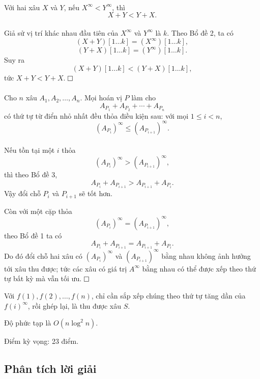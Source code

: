 \documentclass[11pt]{article}
\newcommand{\proofbox}{\ensuremath{\vcenter{\hrule height 0.45pt
  \hbox{\vrule width 0.45pt height 6pt\kern 6pt\vrule width 0.45pt}
  \hrule height 0.45pt}}}
\begin{document}
\paragraph{}
Với hai xâu \(X\) và \(Y\), nếu \(X^\infty<Y^\infty\), thì
\[
X+Y<Y+X.
\]

\paragraph{}
Giả sử vị trí khác nhau đầu tiên của \(X^\infty\) và \(Y^\infty\) là \(k\).
Theo Bổ đề 2, ta có
\[
(X+Y)[1\ldots k]=(X^\infty)[1\ldots k],
\]
\[
(Y+X)[1\ldots k]=(Y^\infty)[1\ldots k].
\]
Suy ra
\[
(X+Y)[1\ldots k]<(Y+X)[1\ldots k],
\]
tức \(X+Y<Y+X\). \proofbox

\paragraph{}
Cho \(n\) xâu \(A_1,A_2,\ldots,A_n\). Mọi hoán vị \(P\) làm cho
\[
A_{P_1}+A_{P_2}+\cdots+A_{P_n}
\]
có thứ tự từ điển nhỏ nhất đều thỏa điều kiện sau: với mọi \(1\le i<n\),
\[
(A_{P_i})^\infty\le (A_{P_{i+1}})^\infty.
\]

\paragraph{}
Nếu tồn tại một \(i\) thỏa
\[
(A_{P_i})^\infty>(A_{P_{i+1}})^\infty,
\]
thì theo Bổ đề 3,
\[
A_{P_i}+A_{P_{i+1}}>A_{P_{i+1}}+A_{P_i}.
\]
Vậy đổi chỗ \(P_i\) và \(P_{i+1}\) sẽ tốt hơn.

Còn với một cặp thỏa
\[
(A_{P_i})^\infty=(A_{P_{i+1}})^\infty,
\]
theo Bổ đề 1 ta có
\[
A_{P_i}+A_{P_{i+1}}=A_{P_{i+1}}+A_{P_i}.
\]
Do đó đổi chỗ hai xâu có \((A_{P_i})^\infty\) và
\((A_{P_{i+1}})^\infty\) bằng nhau không ảnh hưởng tới xâu thu được; tức các
xâu có giá trị \(A^\infty\) bằng nhau có thể được xếp theo thứ tự bất kỳ mà
vẫn tối ưu. \proofbox

Với \(f(1),f(2),\ldots,f(n)\), chỉ cần sắp xếp chúng theo thứ tự tăng dần của
\(f(i)^\infty\), rồi ghép lại, là thu được xâu \(S\).

Độ phức tạp là \(O(n\log^2 n)\).

Điểm kỳ vọng: 23 điểm.

\subsection{Phân tích lời giải}
\end{document}
